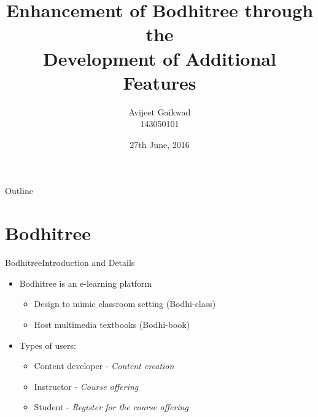 \documentclass[xcolor=table]{beamer}
\title[Feature addition to Bodhitree]{Enhancement of Bodhitree through the \\ Development of Additional Features}
\author{Avijeet Gaikwad \\ 143050101}
\institute[] %
{  Guided by \\
	\vspace{0.1cm}
	{\small Prof. Kameswari Chebrolu} \\
	\vspace{0.5cm}
	Department of Computer Science and Engineering\\
	IIT Bombay
}
\date{27th June, 2016}
\begin{document}
\begin{frame}
  \titlepage
\end{frame}

\begin{frame}{Outline}
    \tableofcontents
\end{frame}

\section{Bodhitree}


\begin{frame}{Bodhitree}{Introduction and Details}
  \begin{itemize}
  \item {
    Bodhitree is an e-learning platform
    \begin{itemize}
    	\item Design to mimic classroom setting (Bodhi-class)
    	\item Host multimedia textbooks (Bodhi-book)
    \end{itemize}
  }
  \item {
    Types of users:
    \begin{itemize}
    	\item Content developer - \textit{Content creation}
    	\item Instructor - \textit{Course offering}
    	\item Student - \textit{Register for the course offering}
    \end{itemize}
  }
\end{itemize}
\end{frame}

\end{document}
